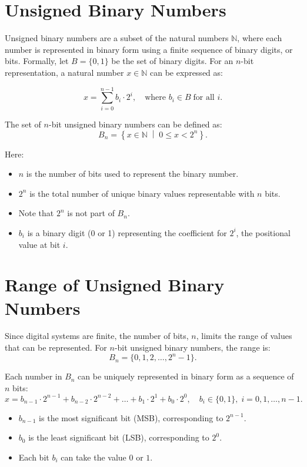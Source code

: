 \section{Unsigned Binary Numbers}
Unsigned binary numbers are a subset of the natural numbers \( \mathbb{N} \), where each number is represented in binary form using a finite sequence of binary digits, or bits. Formally, let \( B = \{0, 1\} \) be the set of binary digits. For an \( n \)-bit representation, a natural number \( x \in \mathbb{N} \) can be expressed as:

\[
x = \sum_{i=0}^{n-1} b_i \cdot 2^i, \quad \text{where } b_i \in B \; \text{for all } i.
\]

The set of \( n \)-bit unsigned binary numbers can be defined as:
\[
B_n = \left\{ x \in \mathbb{N} \; \middle| \; 0 \leq x < 2^n \right\}.
\]

Here:
\begin{itemize}
    \item \( n \) is the number of bits used to represent the binary number.
    \item \( 2^n \) is the total number of unique binary values representable with \( n \) bits.
    \item Note that \( 2^n \) is not part of \( B_n\).
    \item \( b_i \) is a binary digit (0 or 1) representing the coefficient for \( 2^i \), the positional value at bit \( i \).
\end{itemize}




\section{Range of Unsigned Binary Numbers}

Since digital systems are finite, the number of bits, \( n \), limits the range of values that can be represented. For \( n \)-bit unsigned binary numbers, the range is:
\[
B_n = \{0, 1, 2, \dots, 2^n - 1\}.
\]

Each number in \( B_n \) can be uniquely represented in binary form as a sequence of \( n \) bits:
\[
x = b_{n-1} \cdot 2^{n-1} + b_{n-2} \cdot 2^{n-2} + \dots + b_1 \cdot 2^1 + b_0 \cdot 2^0, \quad b_i \in \{0, 1\}, \; i = 0, 1, \dots, n-1.
\]

\begin{itemize}
    \item \( b_{n-1} \) is the most significant bit (MSB), corresponding to \( 2^{n-1} \).
    \item \( b_0 \) is the least significant bit (LSB), corresponding to \( 2^0 \).
    \item Each bit \( b_i \) can take the value \( 0 \) or \( 1 \).
\end{itemize}

